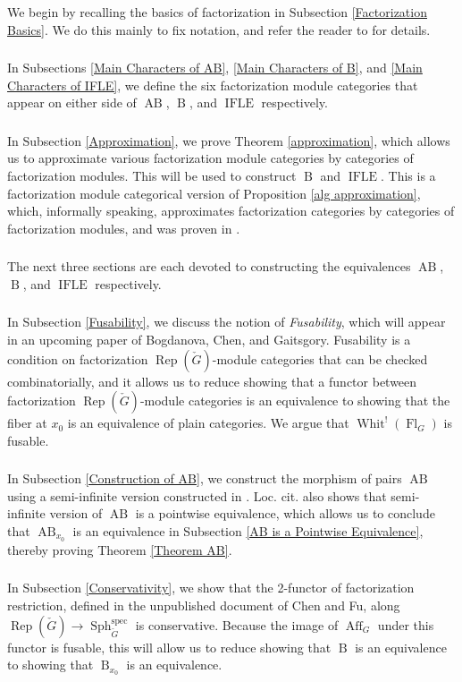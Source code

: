 \documentclass[10pt]{amsart}
\theoremstyle{remark}
\newcommand{\on}[1]{\operatorname{#1}}
\newcommand{\Gcheck}{\check{G}}
\newcommand{\sssec}[1]{\subsubsection{}}
\begin{document}
\sssec{}
We begin by recalling the basics of factorization in Subsection \ref{Factorization Basics}. We do this mainly to fix notation, and refer the reader to \cite{factorization} for details.

\sssec{}
In Subsections \ref{Main Characters of AB}, \ref{Main Characters of B}, and \ref{Main Characters of IFLE}, we define the six factorization module categories that appear on either side of $\on{AB}$, $\on{B}$, and $\on{IFLE}$ respectively.

\sssec{}
In Subsection \ref{Approximation}, we prove Theorem \ref{approximation}, which allows us to approximate various factorization module categories by categories of factorization modules. This will be used to construct $\on{B}$ and $\on{IFLE}$. This is a factorization module categorical version of Proposition \ref{alg approximation}, which, informally speaking, approximates factorization categories by categories of factorization modules, and was proven in \cite{GLC2}.

\sssec{}
The next three sections are each devoted to constructing the equivalences $\on{AB}$, $\on{B}$, and $\on{IFLE}$ respectively.

\sssec{}
In Subsection \ref{Fusability}, we discuss the notion of \emph{Fusability}, which will appear in an upcoming paper \cite{BCG} of Bogdanova, Chen, and Gaitsgory. Fusability is a condition on factorization $\on{Rep}(\Gcheck)$-module categories that can be checked combinatorially, and it allows us to reduce showing that a functor between factorization $\on{Rep}(\Gcheck)$-module categories is an equivalence to showing that the fiber at $x_0$ is an equivalence of plain categories. We argue that $\on{Whit}^!(\on{Fl}_G)$ is fusable.

\sssec{}
In Subsection \ref{Construction of AB}, we construct the morphism of pairs $\on{AB}$ using a semi-infinite version constructed in \cite{GLC3}. Loc. cit. also shows that semi-infinite version of $\on{AB}$ is a pointwise equivalence, which allows us to conclude that $\on{AB}_{x_0}$ is an equivalence in Subsection \ref{AB is a Pointwise Equivalence}, thereby proving Theorem \ref{Theorem AB}.

\sssec{}
In Subsection \ref{Conservativity}, we show that the 2-functor of factorization restriction, defined in the unpublished document \cite{CF} of Chen and Fu, along $\on{Rep}(\Gcheck) \longrightarrow \on{Sph}_{\Gcheck}^{\on{spec}}$ is conservative. Because the image of $\on{Aff}_G$ under this functor is fusable, this will allow us to reduce showing that $\on{B}$ is an equivalence to showing that $\on{B}_{x_0}$ is an equivalence.
\end{document}
